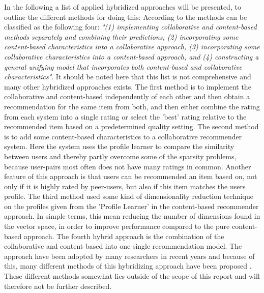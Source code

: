 In the following a list of applied hybridized approaches will be presented, to outline the different methods for doing this:
According to \citet[p. 20-22]{TowardsTheNextGenerationOfRs} the methods can be classified as the following four: \textit{"(1) implementing collaborative and content-based methods separately and combining their predictions, (2) incorporating some content-based characteristics into a collaborative approach, (3) incorporating some collaborative characteristics into a content-based approach, and (4) constructing a general unifying model that incorporates both content-based and collaborative characteristics"}. It should be noted here that this list is not comprehensive and many other hybridized approaches exists. \newline
The first method is to implement the collaborative and content-based independently of each other and then obtain a recommendation for the same item from both, and then either combine the rating from each system into a single rating or select the 'best' rating relative to the recommended item based on a predetermined quality setting. \newline
The second method is to add some content-based characteristics to a collaborative recommender system. Here the system uses the profile learner to compare the similarity between users and thereby partly overcome some of the sparsity problems, because user-pairs most often does not have many ratings in common. Another feature of this approach is that users can be recommended an item based on, not only if it is highly rated by peer-users, but also if this item matches the users profile. \newline
The third method used some kind of dimensionality reduction technique on the profiles given from the 'Profile Learner' in the content-based recommender approach. In simple terms, this mean reducing the number of dimensions found in the vector space, in order to improve performance compared to the pure content-based approach. \newline
The fourth hybrid approach is the combination of the collaborative and content-based into one single recommendation model. The approach have been adopted by many researchers in recent years and because of this, many different methods of this hybridizing approach have been proposed \citep[p. 22]{TowardsTheNextGenerationOfRs}. These different methods somewhat lies outside of the scope of this report and will therefore not be further described. \newline


